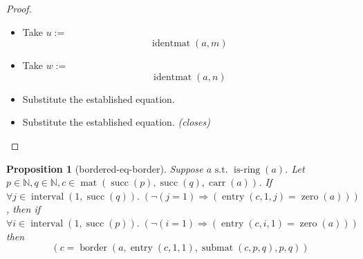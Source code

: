 \documentclass[11pt]{article}
\theoremstyle{plain}
\newtheorem{proposition}{Proposition}
\begin{document}
\begin{proof}
\begin{itemize}[leftmargin=2.8em, itemsep=4pt, parsep=1pt]
  \item[\textbf{9}] Take $u :=$
\begin{equation*}
\operatorname{identmat}(a, m)
\end{equation*}

  \item[\textbf{10--11}] Take $w :=$
\begin{equation*}
\operatorname{identmat}(a, n)
\end{equation*}

  \item[\textbf{12--13}] Substitute the established equation.
  \item[\textbf{14--15}] Substitute the established equation.  \emph{(closes)}
\end{itemize}
\end{proof}

\bigskip

\begin{proposition}[bordered-eq-border]
Suppose $a \text{ s.t. } \operatorname{is\text{-}ring}(a)$. Let $p \in \mathbb{N}, q \in \mathbb{N}, c \in \operatorname{mat}(\operatorname{succ}(p), \operatorname{succ}(q), \operatorname{carr}(a))$. If $\forall j \in \operatorname{interval}(1, \operatorname{succ}(q)).\; (\neg (j = 1) \Rightarrow (\operatorname{entry}(c, 1, j) = \operatorname{zero}(a)))$, then if $\forall i \in \operatorname{interval}(1, \operatorname{succ}(p)).\; (\neg (i = 1) \Rightarrow (\operatorname{entry}(c, i, 1) = \operatorname{zero}(a)))$ then 
\begin{equation*}
(c = \operatorname{border}(a, \operatorname{entry}(c, 1, 1), \operatorname{submat}(c, p, q), p, q))
\end{equation*}

\end{proposition}
\end{document}
